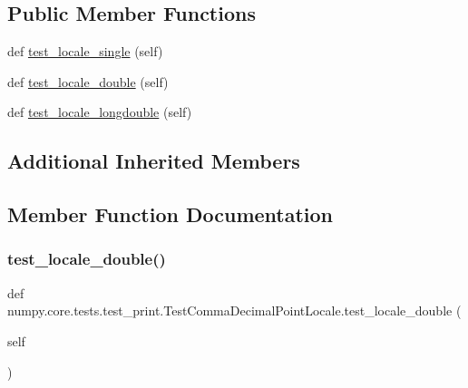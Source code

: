 \subsection*{Public Member Functions}
\begin{DoxyCompactItemize}
\item 
def \hyperlink{classnumpy_1_1core_1_1tests_1_1test__print_1_1TestCommaDecimalPointLocale_a376c1bbec1e8a01cde26a5a6dfdd798c}{test\+\_\+locale\+\_\+single} (self)
\item 
def \hyperlink{classnumpy_1_1core_1_1tests_1_1test__print_1_1TestCommaDecimalPointLocale_a18e8c636c1bbd5003989d46cd54856c7}{test\+\_\+locale\+\_\+double} (self)
\item 
def \hyperlink{classnumpy_1_1core_1_1tests_1_1test__print_1_1TestCommaDecimalPointLocale_add38bccbbb63516c8c417c98e0e3cb05}{test\+\_\+locale\+\_\+longdouble} (self)
\end{DoxyCompactItemize}
\subsection*{Additional Inherited Members}


\subsection{Member Function Documentation}
\mbox{\label{classnumpy_1_1core_1_1tests_1_1test__print_1_1TestCommaDecimalPointLocale_a18e8c636c1bbd5003989d46cd54856c7}} 
\subsubsection{\texorpdfstring{test\+\_\+locale\+\_\+double()}{test\_locale\_double()}}
{\footnotesize\ttfamily def numpy.\+core.\+tests.\+test\+\_\+print.\+Test\+Comma\+Decimal\+Point\+Locale.\+test\+\_\+locale\+\_\+double (\begin{DoxyParamCaption}\item[{}]{self }\end{DoxyParamCaption})}

